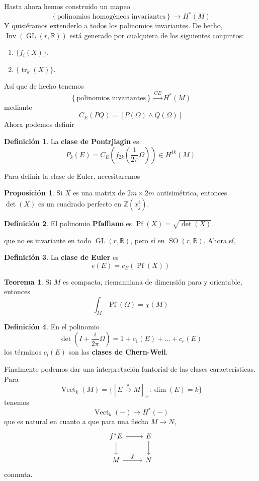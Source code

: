 \documentclass[spanish]{book}
\theoremstyle{definition}
\newtheorem*{defn}{Definición}
\newtheorem*{teo}{Teorema}
\newtheorem*{prop}{Proposición}
\newcommand{\R}{\mathbb{R}}
\newcommand{\Z}{\mathbb{Z}}
\begin{document}
Hasta ahora hemos construido un mapeo
\[\left\{\text{polinomios homogéneos invariantes}\right\}\longrightarrow H^*(M)\]
Y quisiéramos extenderlo a todos los polinomios invariantes. De hecho, $\operatorname{Inv}(\operatorname{GL}(r,\R))$ está generado por cualquiera de los siguientes conjuntos:
\begin{enumerate}
	\item $\{f_i(X)\}$.
	\item $\{\operatorname{tr}_k(X)\}$.
\end{enumerate}
Así que de hecho tenemos
\[\left\{\text{polinomios invariantes}\right\}\overset{CE}{\longrightarrow} H^*(M)\]
mediante
\[C_E(PQ)=[P(\Omega)\wedge Q(\Omega)]\]
Ahora podemos definir
\begin{defn}
La \textbf{clase de Pontrjiagin} es:
	\[P_k(E)=C_E\left(f_{2k}\left(\frac{1}{2\pi}\Omega\right)\right)\in H^{4k}(M)\]	
\end{defn}
Para definir la clase de Euler, necesitaremos
\begin{prop}
	Si $X$ es una matrix de $2m\times 2m$ antisimétrica, entonces $\det(X)$ es un cuadrado perfecto en $\Z(x^i_j)$.
\end{prop}
\begin{defn}
	El polinomio \textbf{Pfaffiano} es $\operatorname{Pf}(X)=\sqrt{\det(X)}$.
\end{defn}
que no es invariante en todo $\operatorname{GL}(r,\R)$, pero sí en $\operatorname{SO}(r,\R)$. Ahora sí,
\begin{defn}
	La \textbf{clase de Euler} es
	\[e(E)=c_E(\operatorname{Pf}(X))\]
\end{defn}
\begin{teo}
	Si $M$ es compacta, riemanniana de dimensión para y orientable, entonces
	\[\int_M\operatorname{Pf}(\Omega)=\chi(M)\]
\end{teo}
\begin{defn}
	En el polinomio
	\[\det(I+\frac{i}{2\pi}\Omega)=1+c_1(E)+\ldots+c_r(E)\]
	 los términos $c_i(E)$ son las \textbf{clases de Chern-Weil}.
\end{defn}

Finalmente podemos dar una interpretación funtorial de las clases características. Para
\[\operatorname{Vect}_k(M)=\{[E\overset{\pi}{\to}M]_{\simeq}:\dim(E)=k\}\]
tenemos
\[\operatorname{Vect}_k(-)\to H^*(-)\]
que es natural en cuanto a que para una flecha $M\to N$,
\[\begin{tikzcd}
	f^*E\arrow[r]\arrow[d]&E\arrow[d]\\
	M\arrow[r,"f"]&N
\end{tikzcd}\]
conmuta.
\end{document}
